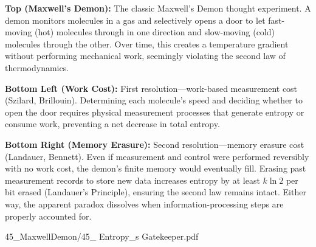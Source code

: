 \begin{SideNotePage}{
  \textbf{Top (Maxwell's Demon):} The classic Maxwell’s Demon thought experiment. A demon monitors molecules in a gas and selectively opens a door to let fast-moving (hot) molecules through in one direction and slow-moving (cold) molecules through the other. Over time, this creates a temperature gradient without performing mechanical work, seemingly violating the second law of thermodynamics. \par
  \textbf{Bottom Left (Work Cost):} First resolution—work-based measurement cost (Szilard, Brillouin). Determining each molecule’s speed and deciding whether to open the door requires physical measurement processes that generate entropy or consume work, preventing a net decrease in total entropy. \par
  \textbf{Bottom Right (Memory Erasure):} Second resolution—memory erasure cost (Landauer, Bennett). Even if measurement and control were performed reversibly with no work cost, the demon’s finite memory would eventually fill. Erasing past measurement records to store new data increases entropy by at least $k \ln 2$ per bit erased (Landauer’s Principle), ensuring the second law remains intact. Either way, the apparent paradox dissolves when information-processing steps are properly accounted for.
}{45_MaxwellDemon/45_ Entropy_s Gatekeeper.pdf}
\end{SideNotePage}

